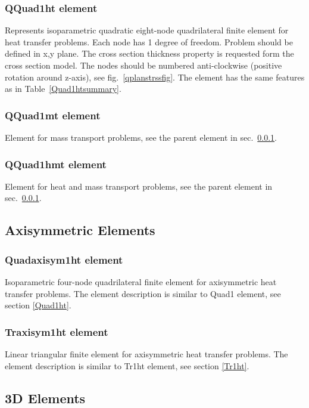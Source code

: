 \documentclass[a4paper]{article}
\begin{document}
\subsubsection{QQuad1ht element}
\label{QQuad1ht}
Represents isoparametric quadratic eight-node quadrilateral finite element for
heat transfer problems. Each node has 1 degree of freedom.
Problem should be defined in x,y plane. The cross section thickness
property is requested form the cross section model.
The nodes should be numbered anti-clockwise (positive rotation around
z-axis), see fig.~\ref{qplanstrssfig}. The element has the same features as in Table~\ref{Quad1htsummary}.

\subsubsection{QQuad1mt element}
Element for mass transport problems, see the parent element in sec.~\ref{QQuad1ht}. 

\subsubsection{QQuad1hmt element}
Element for heat and mass transport problems, see the parent element in sec.~\ref{QQuad1ht}.

\clearpage
\subsection{Axisymmetric Elements}
\subsubsection{Quadaxisym1ht element}
Isoparametric four-node quadrilateral finite element for
axisymmetric heat transfer problems. The element description is
similar to Quad1 element, see section \ref{Quad1ht}.


\subsubsection{Traxisym1ht element}
Linear triangular finite element for axisymmetric heat transfer
problems. The element description is
similar to Tr1ht element, see section \ref{Tr1ht}.

\clearpage
\subsection{3D Elements}
\end{document}

